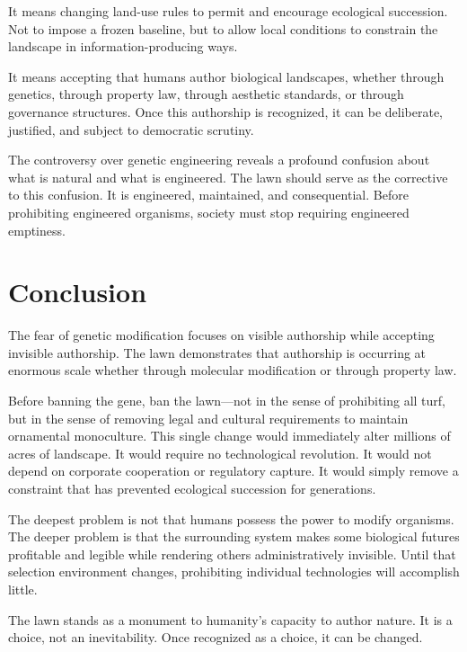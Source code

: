 \documentclass[12pt]{article}
\begin{document}
It means changing land-use rules to permit and encourage ecological succession. Not to impose a frozen baseline, but to allow local conditions to constrain the landscape in information-producing ways.

It means accepting that humans author biological landscapes, whether through genetics, through property law, through aesthetic standards, or through governance structures. Once this authorship is recognized, it can be deliberate, justified, and subject to democratic scrutiny.

The controversy over genetic engineering reveals a profound confusion about what is natural and what is engineered. The lawn should serve as the corrective to this confusion. It is engineered, maintained, and consequential. Before prohibiting engineered organisms, society must stop requiring engineered emptiness.

\section{Conclusion}

The fear of genetic modification focuses on visible authorship while accepting invisible authorship. The lawn demonstrates that authorship is occurring at enormous scale whether through molecular modification or through property law.

Before banning the gene, ban the lawn---not in the sense of prohibiting all turf, but in the sense of removing legal and cultural requirements to maintain ornamental monoculture. This single change would immediately alter millions of acres of landscape. It would require no technological revolution. It would not depend on corporate cooperation or regulatory capture. It would simply remove a constraint that has prevented ecological succession for generations.

The deepest problem is not that humans possess the power to modify organisms. The deeper problem is that the surrounding system makes some biological futures profitable and legible while rendering others administratively invisible. Until that selection environment changes, prohibiting individual technologies will accomplish little.

The lawn stands as a monument to humanity's capacity to author nature. It is a choice, not an inevitability. Once recognized as a choice, it can be changed.
\end{document}
